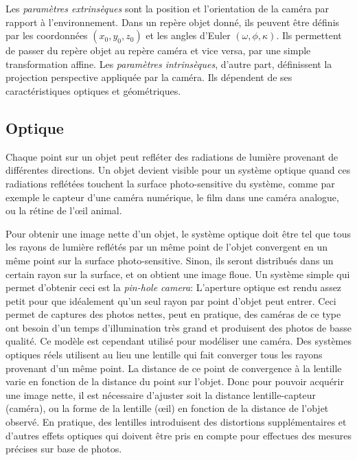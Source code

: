 \documentclass[a4paper,10pt]{scrreprt}
\begin{document}
Les \emph{paramètres extrinsèques} sont la position et l'orientation de la caméra par rapport à l'environnement. Dans un repère objet donné, ils peuvent être définis par les coordonnées $(x_0, y_0, z_0)$ et les angles d'Euler $(\omega, \phi, \kappa)$. Ils permettent de passer du repère objet au repère caméra et vice versa, par une simple transformation affine. Les \emph{paramètres intrinsèques}, d'autre part, définissent la projection perspective appliquée par la caméra. Ils dépendent de ses caractéristiques optiques et géométriques. 

\subsection{Optique}
Chaque point sur un objet peut refléter des radiations de lumière provenant de différentes directions. Un objet devient visible pour un système optique quand ces radiations reflétées touchent la surface photo-sensitive du système, comme par exemple le capteur d'une caméra numérique, le film dans une caméra analogue, ou la rétine de l'œil animal.

Pour obtenir une image nette d'un objet, le système optique doit être tel que tous les rayons de lumière reflétés par un même point de l'objet convergent en un même point sur la surface photo-sensitive. Sinon, ils seront distribués dans un certain rayon sur la surface, et on obtient une image floue. Un système simple qui permet d'obtenir ceci est la \emph{pin-hole camera}: L'aperture optique est rendu assez petit pour que idéalement qu'un seul rayon par point d'objet peut entrer. Ceci permet de captures des photos nettes, peut en pratique, des caméras de ce type ont besoin d'un temps d'illumination très grand et produisent des photos de basse qualité. Ce modèle est cependant utilisé pour modéliser une caméra. Des systèmes optiques réels utilisent au lieu une lentille qui fait converger tous les rayons provenant d'un même point. La distance de ce point de convergence à la lentille varie en fonction de la distance du point sur l'objet. Donc pour pouvoir acquérir une image nette, il est nécessaire d'ajuster soit la distance lentille-capteur (caméra), ou la forme de la lentille (œil) en fonction de la distance de l'objet observé. En pratique, des lentilles introduisent des distortions supplémentaires et d'autres effets optiques qui doivent être pris en compte pour effectues des mesures précises sur base de photos. \cite{Truc1998}
\end{document}
